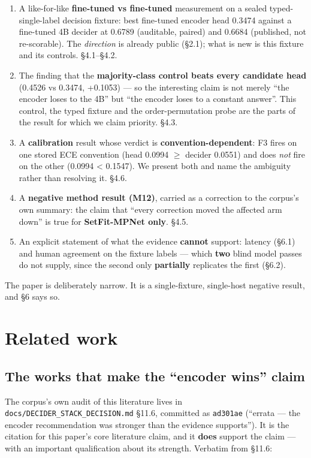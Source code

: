 \documentclass[11pt,a4paper]{article}
\begin{document}
\begin{enumerate}
\item A like-for-like \textbf{fine-tuned vs fine-tuned} measurement on a sealed typed-single-label decision fixture: best fine-tuned encoder head 0.3474 against a fine-tuned 4B decider at 0.6789 (auditable, paired) and 0.6684 (published, not re-scorable). The \emph{direction} is already public (\S2.1); what is new is this fixture and its controls. \S4.1--\S4.2.
\item The finding that the \textbf{majority-class control beats every candidate head} (0.4526 vs 0.3474, +0.1053) --- so the interesting claim is not merely ``the encoder loses to the 4B'' but ``the encoder loses to a constant answer''. This control, the typed fixture and the order-permutation probe are the parts of the result for which we claim priority. \S4.3.
\item A \textbf{calibration} result whose verdict is \textbf{convention-dependent}: F3 fires on one stored ECE convention (head 0.0994 $\ge$ decider 0.0551) and does \emph{not} fire on the other (0.0994 < 0.1547). We present both and name the ambiguity rather than resolving it. \S4.6.
\item A \textbf{negative method result (M12)}, carried as a correction to the corpus's own summary: the claim that ``every correction moved the affected arm down'' is true for \textbf{SetFit-MPNet only}. \S4.5.
\item An explicit statement of what the evidence \textbf{cannot} support: latency (\S6.1) and human agreement on the fixture labels --- which \textbf{two} blind model passes do not supply, since the second only \textbf{partially} replicates the first (\S6.2).
\end{enumerate}

The paper is deliberately narrow. It is a single-fixture, single-host negative result, and \S6 says so.

\section{Related work}

\subsection{The works that make the ``encoder wins'' claim}

The corpus's own audit of this literature lives in \texttt{docs/DECIDER\_STACK\_DECISION.md} \S11.6\cite{source_decider_stack_2026}, committed as \texttt{ad301ae} (``errata --- the encoder recommendation was stronger than the evidence supports''). It is the citation for this paper's core literature claim, and it \textbf{does} support the claim --- with an important qualification about its strength. Verbatim from \S11.6:
\end{document}

